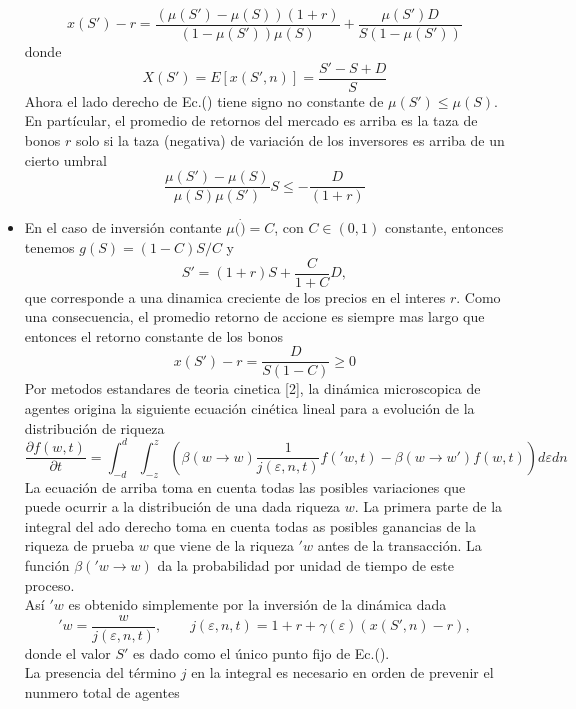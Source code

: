 \documentclass[12pt]{article}
\begin{document}
\begin{itemize}
\begin{equation}
x(S')-r=\frac{(\mu(S')-\mu(S))(1+r)}{(1-\mu(S'))\mu(S)}+\frac{\mu(S')D}{S(1-\mu(S'))} \label{ec24}
\end{equation}
donde
\begin{equation}
X(S')= E[x(S',n)]=\frac{S'-S+D}{S}
\end{equation}
Ahora el lado derecho de Ec.(\cite{ec24}) tiene signo no constante de $\mu(S')\leq \mu(S) $. En partícular, el promedio de retornos del mercado es arriba es la taza de bonos $r$ solo si la taza (negativa) de variación de los inversores es arriba de un cierto umbral
$$
\frac{\mu(S')-\mu(S)}{\mu(S)\mu(S')}S\leq -\frac{D}{(1+r)}
$$
\item En el caso de inversión contante $\mu(\dot)=C$, con $C\in (0,1)$ constante, entonces tenemos $g(S)=(1-C)S/C$ y
$$
S'=(1+r)S+\frac{C}{1+C}D,
$$
que corresponde a una dinamica creciente de los precios en el interes $r$. Como una consecuencia, el promedio retorno de accione es siempre mas largo que entonces el retorno constante de los bonos
$$
x(S')-r=\frac{D}{S(1-C)}\geq 0
$$
\quad Por metodos estandares de teoria cinetica [2], la dinámica microscopica de agentes origina la siguiente ecuación cinética lineal para a evolución de la distribución de riqueza
\begin{equation}
\frac{\partial f(w,t)}{\partial t} = \int^{d}_{-d}\int^{z}_{-z} \left(\beta(w\rightarrow w) \frac{1}{j(\varepsilon,n,t)}f('w,t)-\beta(w\rightarrow w')f(w,t)\right)d\varepsilon dn
\end{equation}
La ecuación de arriba toma en cuenta todas las posibles variaciones que puede ocurrir a la distribución de una dada riqueza $w$. La primera parte de la integral del ado derecho toma en cuenta todas as posibles ganancias de la riqueza de prueba $w$ que viene de la riqueza $'w$ antes de la transacción. La función $\beta('w\rightarrow w)$ da la probabilidad por unidad de tiempo de este proceso.\\
\quad Así $'w$ es obtenido simplemente por la inversión de la dinámica dada
\begin{equation}
'w=\frac{w}{j(\varepsilon,n,t)}, \quad \quad j(\varepsilon,n,t)=1+r+\gamma(\varepsilon)(x(S',n)-r),
\end{equation} 
donde el valor $S'$ es dado como el único  punto fijo de Ec.(\cite{ec17}).\\
\quad La presencia del término $j$ en la integral es necesario en orden de prevenir el nunmero total de agentes 
\begin{equation}

\end{equation}
\end{itemize}
\end{document}
